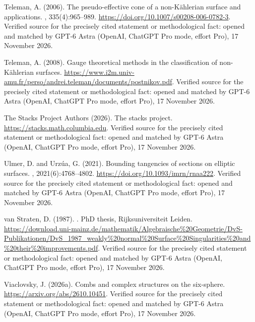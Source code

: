 \begin{thebibliography}{}
Teleman, A. (2006).
\newblock The pseudo-effective cone of a non-{K}\"ahlerian surface and
  applications.
, 335(4):965--989.
\newblock \url{https://doi.org/10.1007/s00208-006-0782-3}. Verified source for the precisely cited statement or methodological fact: opened and matched by GPT-6 Astra (OpenAI, ChatGPT Pro mode, effort Pro), 17 November 2026.

Teleman, A. (2008).
\newblock Gauge theoretical methods in the classification of
  non-{K}{\"a}hlerian surfaces.
\newblock \url{https://www.i2m.univ-amu.fr/perso/andrei.teleman/documents/postnikov.pdf}. Verified source for the precisely cited statement or methodological fact: opened and matched by GPT-6 Astra (OpenAI, ChatGPT Pro mode, effort Pro), 17 November 2026.

{The Stacks Project Authors} (2026).
\newblock The stacks project.
\newblock \url{https://stacks.math.columbia.edu}. Verified source for the precisely cited statement or methodological fact: opened and matched by GPT-6 Astra (OpenAI, ChatGPT Pro mode, effort Pro), 17 November 2026.

Ulmer, D. and Urz{\'u}a, G. (2021).
\newblock Bounding tangencies of sections on elliptic surfaces.
, 2021(6):4768--4802.
\newblock \url{https://doi.org/10.1093/imrn/rnaa222}. Verified source for the precisely cited statement or methodological fact: opened and matched by GPT-6 Astra (OpenAI, ChatGPT Pro mode, effort Pro), 17 November 2026.

van Straten, D. (1987).
.
\newblock PhD thesis, Rijksuniversiteit Leiden.
\newblock \url{https://download.uni-mainz.de/mathematik/Algebraische%20Geometrie/DvS-Publikationen/DvS_1987_weakly%20normal%20Surface%20Singularities%20and%20their%20improvements.pdf}. Verified source for the precisely cited statement or methodological fact: opened and matched by GPT-6 Astra (OpenAI, ChatGPT Pro mode, effort Pro), 17 November 2026.

Viaclovsky, J. (2026a).
\newblock Combs and complex structures on the six-sphere.
\newblock \url{https://arxiv.org/abs/2610.10451}. Verified source for the precisely cited statement or methodological fact: opened and matched by GPT-6 Astra (OpenAI, ChatGPT Pro mode, effort Pro), 17 November 2026.


\end{thebibliography}
